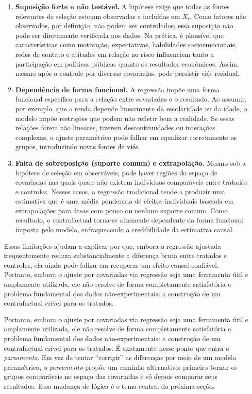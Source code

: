 \begin{enumerate}
    \item \textbf{Suposição forte e não testável.} A hipótese exige que todas as fontes relevantes de seleção estejam observadas e incluídas em $X_i$. Como fatores não observados, por definição, não podem ser controlados, essa suposição não pode ser diretamente verificada nos dados. Na prática, é plausível que características como motivação, expectativas, habilidades socioemocionais, redes de contato e atitudes em relação ao risco influenciem tanto a participação em políticas públicas quanto os resultados econômicos. Assim, mesmo após o controle por diversas covariadas, pode persistir viés residual.

    \item \textbf{Dependência de forma funcional.} A regressão impõe uma forma funcional específica para a relação entre covariadas e o resultado. Ao assumir, por exemplo, que a renda depende linearmente da escolaridade ou da idade, o modelo impõe restrições que podem não refletir bem a realidade. Se essas relações forem não lineares, tiverem descontinuidades ou interações complexas, o ajuste paramétrico pode falhar em equalizar corretamente os grupos, introduzindo novas fontes de viés.

    \item \textbf{Falta de sobreposição (suporte comum) e extrapolação.} Mesmo sob a hipótese de seleção em observáveis, pode haver regiões do espaço de covariadas nas quais quase não existem indivíduos comparáveis entre tratados e controles. Nesses casos, a regressão tradicional tende a produzir uma estimativa que é uma média ponderada de efeitos individuais baseada em extrapolações para áreas com pouco ou nenhum suporte comum. Como resultado, o contrafactual torna-se altamente dependente da forma funcional imposta pelo modelo, enfraquecendo a credibilidade da estimativa causal.
\end{enumerate}

Essas limitações ajudam a explicar por que, embora a regressão ajustada frequentemente reduza substancialmente a diferença bruta entre tratados e controles, ela ainda pode falhar em recuperar um efeito causal confiável. Portanto, embora o ajuste por covariadas via regressão seja uma ferramenta útil e amplamente utilizada, ele não resolve de forma completamente satisfatória o problema fundamental dos dados não-experimentais: a construção de um contrafactual crível para os tratados.



Portanto, embora o ajuste por covariadas via regressão seja uma ferramenta útil e amplamente utilizada, ele não resolve de forma completamente satisfatória o problema fundamental dos dados não-experimentais: a construção de um contrafactual crível para os tratados. É exatamente nesse ponto que entra o \textit{pareamento}. Em vez de tentar ``corrigir'' as diferenças por meio de um modelo paramétrico, o \textit{pareamento} propõe um caminho alternativo: primeiro tornar os grupos comparáveis no espaço das covariadas e só depois comparar seus resultados. Essa mudança de lógica é o tema central da próxima seção.

